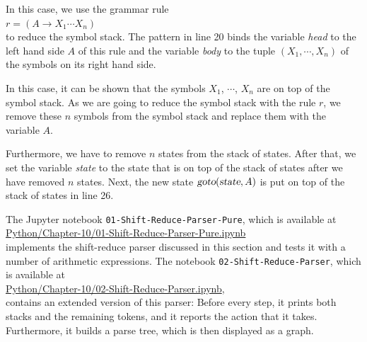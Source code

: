 \begin{enumerate}
\begin{enumerate}
            In this case, we use the grammar rule
            \\[0.2cm]
            \hspace*{1.3cm}
            $r = (A \rightarrow X_1 \cdots X_n)$
            \\[0.2cm]
            to reduce the symbol stack.  The pattern in line 20 binds the variable \textsl{head} to the left
            hand side $A$ of this rule and the variable \textsl{body} to the tuple $(X_1, \cdots,X_n)$ of the
            symbols on its right hand side.

            In this case, it can be shown that the symbols $X_1$, $\cdots$, $X_n$ are on top of the
            symbol stack.  As we are going to reduce the symbol stack with the rule $r$,
            we remove these $n$ symbols from the symbol stack and replace them with the
            variable $A$.

            Furthermore, we have to remove $n$ states from the stack of states.
            After that, we set the variable \textsl{state} to the state that is on top of the
            stack of states after we have removed $n$ states.  Next, the new state
            $\textsl{goto}(\textsl{state}, A)$ is put on top of the stack of states in line 26.
      \end{enumerate}
\end{enumerate}
The Jupyter notebook \texttt{01-Shift-Reduce-Parser-Pure}, which is available at
\\[0.2cm]
\hspace*{1.3cm}
\href{https://github.com/karlstroetmann/Formal-Languages/blob/master/Python/Chapter-10/01-Shift-Reduce-Parser-Pure.ipynb}{Python/Chapter-10/01-Shift-Reduce-Parser-Pure.ipynb}
\\[0.2cm]
implements the shift-reduce parser discussed in this section and tests it with a number of arithmetic
expressions.  The notebook \texttt{02-Shift-Reduce-Parser}, which is available at
\\[0.2cm]
\hspace*{1.3cm}
\href{https://github.com/karlstroetmann/Formal-Languages/blob/master/Python/Chapter-10/02-Shift-Reduce-Parser.ipynb}{Python/Chapter-10/02-Shift-Reduce-Parser.ipynb},
\\[0.2cm]
contains an extended version of this parser:  Before every step, it prints both stacks and the remaining tokens,
and it reports the action that it takes.  Furthermore, it builds a parse tree, which is then displayed as a graph.

